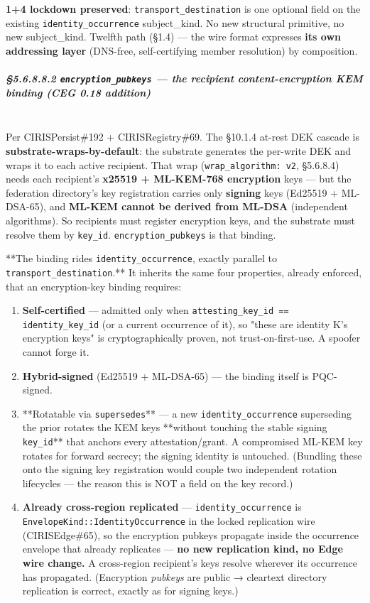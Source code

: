 \documentclass[10pt]{article}
\begin{document}
\textbf{1+4 lockdown preserved}: \texttt{transport\_destination} is one optional field on the existing \texttt{identity\_occurrence} subject\_kind. No new structural primitive, no new subject\_kind. Twelfth path (§1.4) — the wire format expresses \textbf{its own addressing layer} (DNS-free, self-certifying member resolution) by composition.


\subparagraph{§5.6.8.8.2 \texttt{encryption\_pubkeys} — the recipient content-encryption KEM binding (CEG 0.18 addition)}\mbox{}\\


Per CIRISPersist\#192 + CIRISRegistry\#69. The §10.1.4 at-rest DEK cascade is \textbf{substrate-wraps-by-default}: the substrate generates the per-write DEK and wraps it to each active recipient. That wrap (\texttt{wrap\_algorithm: v2}, §5.6.8.4) needs each recipient's \textbf{x25519 + ML-KEM-768 encryption} keys — but the federation directory's key registration carries only \textbf{signing} keys (Ed25519 + ML-DSA-65), and \textbf{ML-KEM cannot be derived from ML-DSA} (independent algorithms). So recipients must register encryption keys, and the substrate must resolve them by \texttt{key\_id}. \texttt{encryption\_pubkeys} is that binding.


**The binding rides \texttt{identity\_occurrence}, exactly parallel to \texttt{transport\_destination}.** It inherits the same four properties, already enforced, that an encryption-key binding requires:

\begin{enumerate}\setlength\itemsep{0pt}
\item \textbf{Self-certified} — admitted only when \texttt{attesting\_key\_id == identity\_key\_id} (or a current occurrence of it), so "these are identity K's encryption keys" is cryptographically proven, not trust-on-first-use. A spoofer cannot forge it.
\item \textbf{Hybrid-signed} (Ed25519 + ML-DSA-65) — the binding itself is PQC-signed.
\item **Rotatable via \texttt{supersedes}** — a new \texttt{identity\_occurrence} superseding the prior rotates the KEM keys **without touching the stable signing \texttt{key\_id}** that anchors every attestation/grant. A compromised ML-KEM key rotates for forward secrecy; the signing identity is untouched. (Bundling these onto the signing key registration would couple two independent rotation lifecycles — the reason this is NOT a field on the key record.)
\item \textbf{Already cross-region replicated} — \texttt{identity\_occurrence} is \texttt{EnvelopeKind::IdentityOccurrence} in the locked replication wire (CIRISEdge\#65), so the encryption pubkeys propagate inside the occurrence envelope that already replicates — \textbf{no new replication kind, no Edge wire change.} A cross-region recipient's keys resolve wherever its occurrence has propagated. (Encryption \textit{pubkeys} are public → cleartext directory replication is correct, exactly as for signing keys.)
\end{enumerate}
\end{document}
